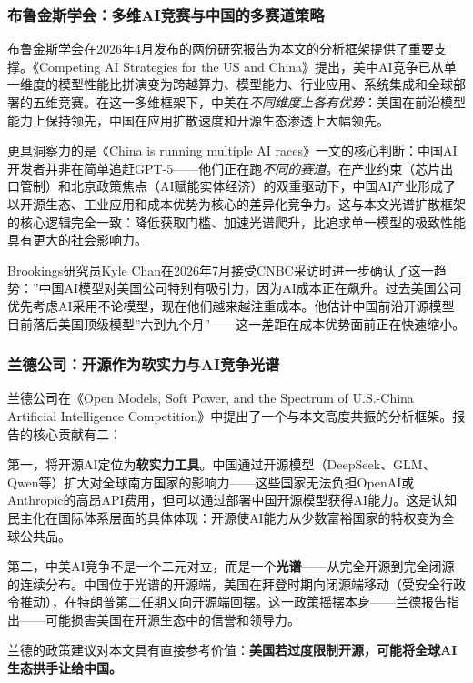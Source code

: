 \documentclass[12pt,a4paper]{ctexart}
\begin{document}
\subsubsection{布鲁金斯学会：多维AI竞赛与中国的多赛道策略}

布鲁金斯学会在2026年4月发布的两份研究报告为本文的分析框架提供了重要支撑。《Competing AI Strategies for the US and China》提出，美中AI竞争已从单一维度的模型性能比拼演变为跨越算力、模型能力、行业应用、系统集成和全球部署的五维竞赛。在这一多维框架下，中美在\emph{不同维度上各有优势}：美国在前沿模型能力上保持领先，中国在应用扩散速度和开源生态渗透上大幅领先。

更具洞察力的是《China is running multiple AI races》一文的核心判断：中国AI开发者并非在简单追赶GPT-5——他们正在跑\emph{不同的赛道}。在产业约束（芯片出口管制）和北京政策焦点（AI赋能实体经济）的双重驱动下，中国AI产业形成了以开源生态、工业应用和成本优势为核心的差异化竞争力。这与本文光谱扩散框架的核心逻辑完全一致：降低获取门槛、加速光谱爬升，比追求单一模型的极致性能具有更大的社会影响力。

Brookings研究员Kyle Chan在2026年7月接受CNBC采访时进一步确认了这一趋势：''中国AI模型对美国公司特别有吸引力，因为AI成本正在飙升。过去美国公司优先考虑AI采用不论模型，现在他们越来越注重成本。他估计中国前沿开源模型目前落后美国顶级模型''六到九个月''——这一差距在成本优势面前正在快速缩小。

\subsubsection{兰德公司：开源作为软实力与AI竞争光谱}

兰德公司在《Open Models, Soft Power, and the Spectrum of U.S.-China Artificial Intelligence Competition》中提出了一个与本文高度共振的分析框架。报告的核心贡献有二：

第一，将开源AI定位为\textbf{软实力工具}。中国通过开源模型（DeepSeek、GLM、Qwen等）扩大对全球南方国家的影响力——这些国家无法负担OpenAI或Anthropic的高昂API费用，但可以通过部署中国开源模型获得AI能力。这是认知民主化在国际体系层面的具体体现：开源使AI能力从少数富裕国家的特权变为全球公共品。

第二，中美AI竞争不是一个二元对立，而是一个\textbf{光谱}——从完全开源到完全闭源的连续分布。中国位于光谱的开源端，美国在拜登时期向闭源端移动（受安全行政令推动），在特朗普第二任期又向开源端回摆。这一政策摇摆本身——兰德报告指出——可能损害美国在开源生态中的信誉和领导力。

兰德的政策建议对本文具有直接参考价值：\textbf{美国若过度限制开源，可能将全球AI生态拱手让给中国。}
\end{document}
